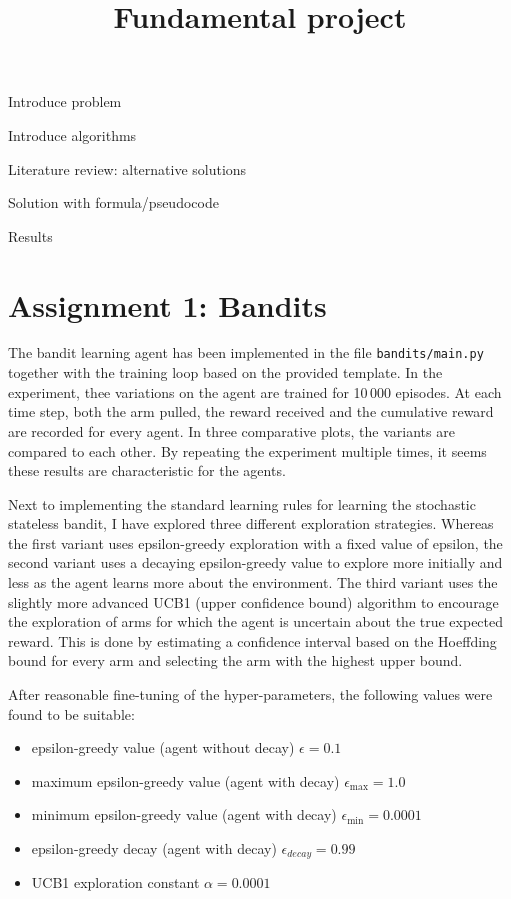 \documentclass[10pt]{article}
\title{Fundamental project}
\begin{document}
    \maketitle

    Introduce problem

    Introduce algorithms

    Literature review: alternative solutions

    Solution with formula/pseudocode

    Results

    \section{Assignment 1: Bandits}

    The bandit learning agent has been implemented in the file \texttt{bandits/main.py} together with the training loop
    based on the provided template.
    In the experiment, thee variations on the agent are trained for 10\,000 episodes.
    At each time step, both the arm pulled, the reward received and the cumulative reward are recorded for every agent.
    In three comparative plots, the variants are compared to each other.
    By repeating the experiment multiple times, it seems these results are characteristic for the agents.

    Next to implementing the standard learning rules for learning the stochastic stateless bandit,
    I have explored three different exploration strategies.
    Whereas the first variant uses epsilon-greedy exploration with a fixed value of epsilon, the second variant
    uses a decaying epsilon-greedy value to explore more initially and less as the agent learns more about the environment.
    The third variant uses the slightly more advanced UCB1 (upper confidence bound) algorithm to encourage the
    exploration of arms for which the agent is uncertain about the true expected reward.
    This is done by estimating a confidence interval based on the Hoeffding bound for every arm and selecting the arm
    with the highest upper bound.

    After reasonable fine-tuning of the hyper-parameters, the following values were found to be suitable:
    \begin{itemize}
        \item epsilon-greedy value (agent without decay) $\epsilon=0.1$
        \item maximum epsilon-greedy value (agent with decay) $\epsilon_{\max}=1.0$
        \item minimum epsilon-greedy value (agent with decay) $\epsilon_{\min}=0.0001$
        \item epsilon-greedy decay (agent with decay) $\epsilon_{decay}=0.99$
        \item UCB1 exploration constant $\alpha=0.0001$
    \end{itemize}
\end{document}
